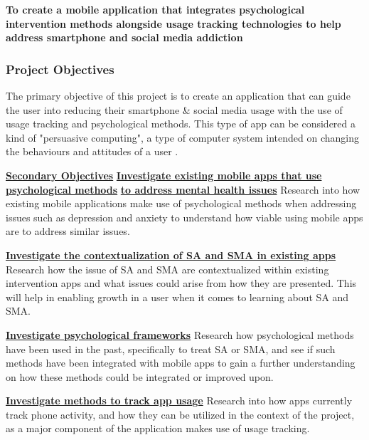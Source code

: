 \documentclass[12pt]{article}
\begin{document}
\noindent\textbf{To create a mobile application that integrates psychological intervention methods alongside usage 
tracking technologies to help address smartphone and social media addiction}

\subsubsection{Project Objectives}
The primary objective of this project is to create an application that can guide the user into reducing their smartphone 
\& social media usage with the use of usage tracking and psychological methods. This type of app can be considered a kind
of "persuasive computing", a type of computer system intended on changing the behaviours and attitudes of a user 
\autocite{RefWorks:RefID:176-davis2009design}.\newline

\noindent\underline{\textbf{Secondary Objectives}}\newline\newline
\noindent\underline{\textbf{Investigate existing mobile apps that use psychological methods}}\newline
\noindent\underline{\textbf{to address mental health issues}}\newline
Research into how existing mobile applications make use of psychological methods when addressing issues such as 
depression and anxiety to understand how viable using mobile apps are to address similar issues.\newline

\noindent\underline{\textbf{Investigate the contextualization of SA and SMA in existing apps}}\newline
Research how the issue of SA and SMA are contextualized within existing intervention apps and what issues could
arise from how they are presented. This will help in enabling growth in a user when it comes to learning about
SA and SMA.\newline

\noindent\underline{\textbf{Investigate psychological frameworks}}\newline
Research how psychological methods have been used in the past, specifically to treat SA or SMA, and see if such 
methods have been integrated with mobile apps to gain a further understanding on how these methods could be 
integrated or improved upon.\newline

\noindent\underline{\textbf{Investigate methods to track app usage}}\newline
Research into how apps currently track phone activity, and how they can be utilized in the context of the project,
as a major component of the application makes use of usage tracking.\newline
\end{document}
